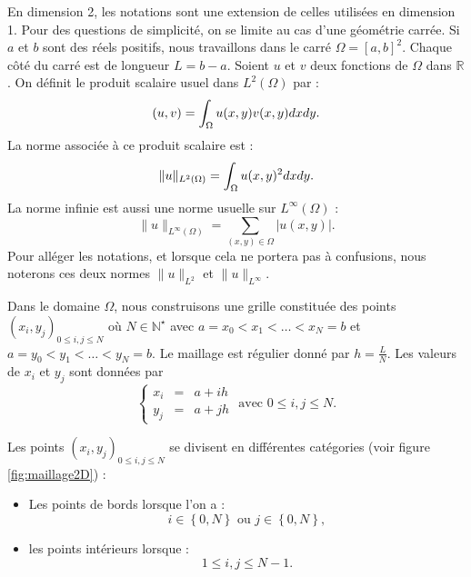 En dimension 2, les notations sont une extension de celles utilisées en dimension 1. Pour des questions de simplicité, on se limite au cas d'une géométrie carrée. Si $a$ et $b$ sont des réels positifs, nous travaillons dans le carré $\Omega = [a,b]^2$. Chaque côté du carré est de longueur $L=b-a$. 
Soient $u$ et $v$ deux fonctions de $\Omega$ dans $\mathbb{R}$. On définit le produit scalaire usuel dans $L^2 ( \Omega ) $ par :
\begin{equation}
(u,v) = \displaystyle\int_{\Omega} u(x,y) v(x,y) dx dy.
\end{equation}
La norme associée à ce produit scalaire est :
\begin{equation}
\| u \|_{L^2(\Omega)} = \displaystyle\int_{\Omega} u(x,y)^2 dx dy. 
\end{equation}
La norme infinie est aussi une norme usuelle sur $L^{\infty}(\Omega)$ :
\begin{equation}
\| u \|_{L^{\infty} ( \Omega )} = \sum_{(x,y) \in \Omega} |u(x,y)|.
\end{equation}
Pour alléger les notations, et lorsque cela ne portera pas à confusions, nous noterons ces deux normes $\| u \|_{L^2}$ et $\| u \|_{L^{\infty}}$.

Dans le domaine $\Omega$, nous construisons une grille constituée des points $(x_i,y_j)_{0 \leq i,j \leq N}$ où $N \in \mathbb{N}^{\star}$ avec $a = x_0 < x_1 < \ldots < x_N = b$ et $a = y_0 < y_1 < \ldots < y_N = b$. Le maillage est régulier donné par $h = \frac{L}{N}$. Les valeurs de $x_i$ et $y_j$ sont données par
\begin{equation}
\left\lbrace\begin{array}{rcl}
x_i & = & a + i h \\
y_j & = & a + j h 
\end{array}\right. \text{ avec } 0 \leq i,j \leq N.
\end{equation}

Les points $(x_i,y_j)_{0 \leq i,j \leq N}$ se divisent en différentes catégories (voir figure \ref{fig:maillage2D}) :
\begin{itemize}
\item Les points de bords lorsque l'on a :
\begin{equation}
i \in \left\lbrace 0 , N \right\rbrace \text{ ou } j \in \left\lbrace 0 , N \right\rbrace,
\end{equation}
\item les points intérieurs lorsque :
\begin{equation}
1 \leq i,j \leq N-1.
\end{equation}
\end{itemize}



